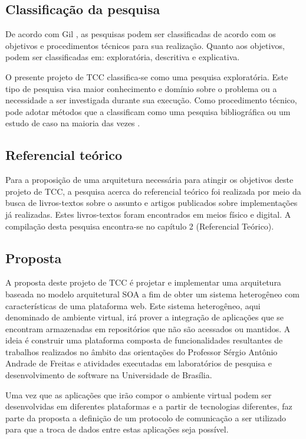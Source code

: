 \subsection{Classificação da pesquisa}
De acordo com Gil \cite{gil_como_2008}, as pesquisas podem ser classificadas de acordo com os objetivos e procedimentos técnicos para sua realização. Quanto aos objetivos, podem ser classificadas em: exploratória, descritiva e explicativa. 

O presente projeto de TCC classifica-se como uma pesquisa exploratória. Este tipo de pesquisa visa maior conhecimento e domínio sobre o problema ou a necessidade a ser investigada durante sua execução. Como procedimento técnico, pode adotar métodos que a classificam como uma pesquisa bibliográfica ou um estudo de caso na maioria das vezes \cite{gil_como_2008}.

\subsection{Referencial teórico}
Para a proposição de uma arquitetura necessária para atingir os objetivos deste projeto de TCC, a pesquisa acerca do referencial teórico foi realizada por meio da busca de livros-textos sobre o assunto e artigos publicados sobre implementações já realizadas. Estes livros-textos foram encontrados em meios físico e digital. A compilação desta pesquisa encontra-se no capítulo 2 (Referencial Teórico).

\subsection{Proposta}
A proposta deste projeto de TCC é projetar e implementar uma arquitetura baseada no modelo arquitetural SOA a fim de obter um sistema heterogêneo com características de uma plataforma web. Este sistema heterogêneo, aqui denominado de ambiente virtual, irá prover a integração de aplicações que se encontram armazenadas em repositórios que não são acessados ou mantidos. A ideia é construir uma plataforma composta de funcionalidades resultantes de trabalhos realizados no âmbito das orientações do Professor Sérgio Antônio Andrade de Freitas e atividades executadas em laboratórios de pesquisa e desenvolvimento de software na Universidade de Brasília.

Uma vez que as aplicações que irão compor o ambiente virtual podem ser desenvolvidas em diferentes plataformas e a partir de tecnologias diferentes, faz parte da proposta a definição de um protocolo de comunicação a ser utilizado para que a troca de dados entre estas aplicações seja possível.

